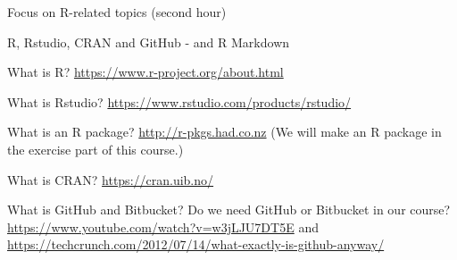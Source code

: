 \documentclass[
  ignorenonframetext,
]{beamer}
\begin{document}
\begin{frame}
\begin{block}{Focus on R-related topics (second hour)}
\protect\hypertarget{focus-on-r-related-topics-second-hour}{}
\end{block}

\begin{block}{R, Rstudio, CRAN and GitHub - and R Markdown}
\protect\hypertarget{r-rstudio-cran-and-github---and-r-markdown}{}
\begin{block}{What is R?}
\protect\hypertarget{what-is-r}{}
\url{https://www.r-project.org/about.html}
\end{block}

\begin{block}{What is Rstudio?}
\protect\hypertarget{what-is-rstudio}{}
\url{https://www.rstudio.com/products/rstudio/}
\end{block}

\begin{block}{What is an R package?}
\protect\hypertarget{what-is-an-r-package}{}
\url{http://r-pkgs.had.co.nz} (We will make an R package in the exercise
part of this course.)
\end{block}

\begin{block}{What is CRAN?}
\protect\hypertarget{what-is-cran}{}
\url{https://cran.uib.no/}
\end{block}

\begin{block}{What is GitHub and Bitbucket?}
\protect\hypertarget{what-is-github-and-bitbucket}{}
Do we need GitHub or Bitbucket in our course?
\url{https://www.youtube.com/watch?v=w3jLJU7DT5E} and
\url{https://techcrunch.com/2012/07/14/what-exactly-is-github-anyway/}
\end{block}
\end{block}
\end{frame}
\end{document}
